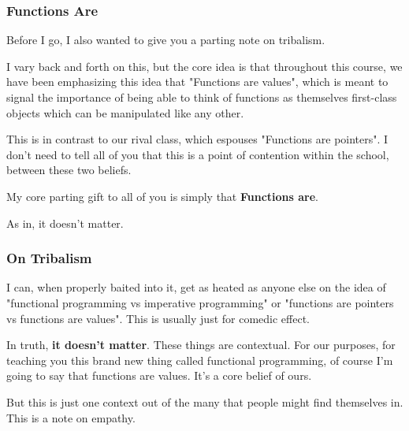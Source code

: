 \documentclass[aspectratio=169, handout]{beamer}
\begin{document}
\begin{frame}[fragile]
  \frametitle{Functions Are}

  Before I go, I also wanted to give you a parting note on tribalism.

  \pause
  \vspace{\fill}

  I vary back and forth on this, but the core idea is that throughout
  this course, we have been emphasizing this idea that "Functions are values",
  which is meant to signal the importance of being able to think of functions
  as themselves first-class objects which can be manipulated like any other.

  \pause
  \vspace{\fill}

  This is in contrast to our rival class, which espouses "Functions are pointers".
  I don't need to tell all of you that this is a point of contention within
  the school, between these two beliefs.

  \pause
  \vspace{\fill}

  My core parting gift to all of you is simply that \textbf{Functions are}.

  \pause
  \vspace{\fill}

  As in, it doesn't matter.
\end{frame}

\begin{frame}[fragile]
  \frametitle{On Tribalism}

  I can, when properly baited into it, get as heated as anyone else on the
  idea of "functional programming vs imperative programming" or "functions are
  pointers vs functions are values". This is usually just for comedic effect.

  \pause
  \vspace{\fill}

  In truth, \textbf{it doesn't matter}. These things are contextual. For
  our purposes, for teaching you this brand new thing called functional
  programming, of course I'm going to say that functions are values. It's a
  core belief of ours.

  \pause
  \vspace{\fill}

  But this is just one context out of the many that people might find themselves
  in. This is a note on empathy.
\end{frame}
\end{document}
